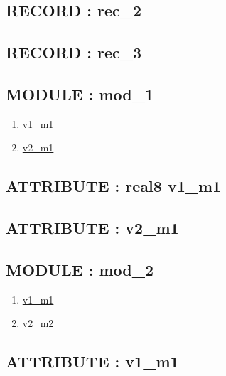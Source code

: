 \subsection*{RECORD : rec\_2}
\hypertarget{ecldoc:intest.inintest.example_2_intest.inintest.example_2.rec_2}{}
\subsection*{RECORD : rec\_3}
\hypertarget{ecldoc:intest.inintest.example_2_intest.inintest.example_2.rec_3}{}
\subsection*{MODULE : mod\_1}
\hypertarget{ecldoc:intest.inintest.example_2_intest.inintest.example_2.mod_1}{}
\begin{enumerate}
\item \hyperlink{ecldoc:intest.inintest.example_2_intest.inintest.example_2.mod_1.v1_m1}{v1\_m1}
\item \hyperlink{ecldoc:intest.inintest.example_2_intest.inintest.example_2.mod_1.v2_m1}{v2\_m1}
\end{enumerate}
\subsection*{ATTRIBUTE : real8 v1\_m1}
\hypertarget{ecldoc:intest.inintest.example_2_intest.inintest.example_2.mod_1.v1_m1}{}
\subsection*{ATTRIBUTE : v2\_m1}
\hypertarget{ecldoc:intest.inintest.example_2_intest.inintest.example_2.mod_1.v2_m1}{}

\subsection*{MODULE : mod\_2}
\hypertarget{ecldoc:intest.inintest.example_2_intest.inintest.example_2.mod_2}{}
\begin{enumerate}
\item \hyperlink{ecldoc:intest.inintest.example_2_intest.inintest.example_2.mod_2.v1_m1}{v1\_m1}
\item \hyperlink{ecldoc:intest.inintest.example_2_intest.inintest.example_2.mod_2.v2_m2}{v2\_m2}
\end{enumerate}
\subsection*{ATTRIBUTE : v1\_m1}
\hypertarget{ecldoc:intest.inintest.example_2_intest.inintest.example_2.mod_2.v1_m1}{}
